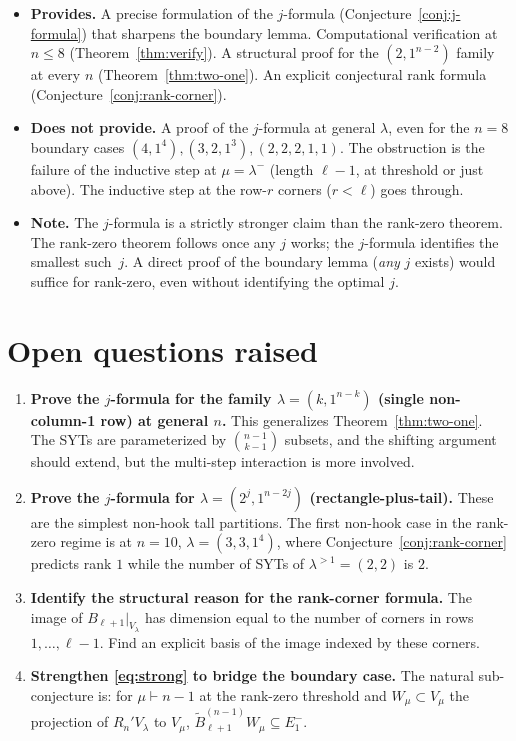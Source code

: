 \documentclass[11pt]{article}
\theoremstyle{definition}
\begin{document}
\begin{itemize}[leftmargin=2em,topsep=0.3em,itemsep=0.2em]
\item \textbf{Provides.} A precise formulation of the $j$-formula
(Conjecture~\ref{conj:j-formula}) that sharpens the boundary lemma.
Computational verification at $n\le 8$ (Theorem~\ref{thm:verify}).
A structural proof for the $(2,1^{n-2})$ family at every $n$
(Theorem~\ref{thm:two-one}).  An explicit conjectural rank formula
(Conjecture~\ref{conj:rank-corner}).

\item \textbf{Does not provide.} A proof of the $j$-formula at general
$\lambda$, even for the $n=8$ boundary cases $(4,1^4),(3,2,1^3),
(2,2,2,1,1)$.  The obstruction is the failure of the inductive step
at $\mu=\lambda^-$ (length $\ell-1$, at threshold or just above).
The inductive step at the row-$r$ corners ($r<\ell$) goes through.

\item \textbf{Note.}  The $j$-formula is a strictly stronger claim
than the rank-zero theorem.  The rank-zero theorem follows once any
$j$ works; the $j$-formula identifies the smallest such~$j$.  A direct
proof of the boundary lemma (\emph{any} $j$ exists) would suffice for
rank-zero, even without identifying the optimal $j$.
\end{itemize}

\section{Open questions raised}

\begin{enumerate}[leftmargin=2em,topsep=0.3em,itemsep=0.2em]

\item \textbf{Prove the $j$-formula for the family $\lambda=
(k,1^{n-k})$ (single non-column-1 row) at general $n$.}
This generalizes Theorem~\ref{thm:two-one}.  The SYTs are
parameterized by $\binom{n-1}{k-1}$ subsets, and the shifting argument
should extend, but the multi-step interaction is more involved.

\item \textbf{Prove the $j$-formula for $\lambda=(2^j,1^{n-2j})$
(rectangle-plus-tail).}  These are the simplest non-hook tall
partitions.  The first non-hook case in the rank-zero regime is at
$n=10$, $\lambda=(3,3,1^4)$, where Conjecture~\ref{conj:rank-corner}
predicts rank $1$ while the number of SYTs of $\lambda^{>1}=(2,2)$
is $2$.

\item \textbf{Identify the structural reason for the rank-corner
formula.}  The image of $B_{\ell+1}|_{V_\lambda}$ has dimension equal
to the number of corners in rows $1,\ldots,\ell-1$.  Find an explicit
basis of the image indexed by these corners.

\item \textbf{Strengthen \eqref{eq:strong} to bridge the boundary case.}
The natural sub-conjecture is: for $\mu\vdash n-1$ at the rank-zero
threshold and $W_\mu\subset V_\mu$ the projection of $R_n'V_\lambda$
to $V_\mu$, $\widetilde B_{\ell+1}^{(n-1)}W_\mu\subseteq E_1^-$.

\end{enumerate}
\end{document}
